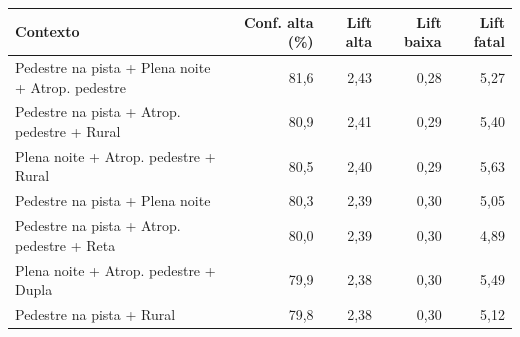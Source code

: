 \begin{tabular}{@{}>{\raggedright\arraybackslash}p{5.9cm}rrrr@{}}
\toprule
\textbf{Contexto} & \textbf{Conf. alta (\%)} & \textbf{Lift alta} & \textbf{Lift baixa} & \textbf{Lift fatal} \\
\midrule
Pedestre na pista + Plena noite + Atrop. pedestre & 81,6 & 2,43 & 0,28 & 5,27 \\
Pedestre na pista + Atrop. pedestre + Rural & 80,9 & 2,41 & 0,29 & 5,40 \\
Plena noite + Atrop. pedestre + Rural & 80,5 & 2,40 & 0,29 & 5,63 \\
Pedestre na pista + Plena noite & 80,3 & 2,39 & 0,30 & 5,05 \\
Pedestre na pista + Atrop. pedestre + Reta & 80,0 & 2,39 & 0,30 & 4,89 \\
Plena noite + Atrop. pedestre + Dupla & 79,9 & 2,38 & 0,30 & 5,49 \\
Pedestre na pista + Rural & 79,8 & 2,38 & 0,30 & 5,12 \\
\bottomrule
\end{tabular}